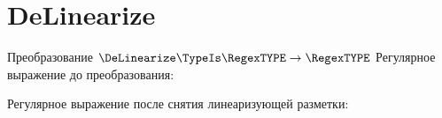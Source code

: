 \section{DeLinearize}
\begin{frame}{Преобразование $\DeLinearize\TypeIs\RegexTYPE\to\RegexTYPE$}
	Регулярное выражение до преобразования:

	Регулярное выражение после снятия линеаризующей разметки:

\end{frame}
